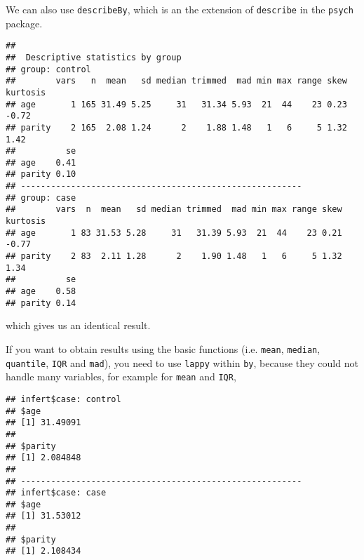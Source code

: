 \documentclass[]{book}
\newenvironment{Shaded}{\begin{snugshade}}{\end{snugshade}}
\newcommand{\KeywordTok}[1]{\textcolor[rgb]{0.13,0.29,0.53}{\textbf{{#1}}}}
\newcommand{\DataTypeTok}[1]{\textcolor[rgb]{0.13,0.29,0.53}{{#1}}}
\newcommand{\StringTok}[1]{\textcolor[rgb]{0.31,0.60,0.02}{{#1}}}
\newcommand{\NormalTok}[1]{{#1}}
\theoremstyle{definition}
\theoremstyle{definition}
\theoremstyle{remark}
\begin{document}
We can also use \texttt{describeBy}, which is an the extension of
\texttt{describe} in the \texttt{psych} package.

\begin{Shaded}
\end{Shaded}

\begin{verbatim}
## 
##  Descriptive statistics by group 
## group: control
##        vars   n  mean   sd median trimmed  mad min max range skew kurtosis
## age       1 165 31.49 5.25     31   31.34 5.93  21  44    23 0.23    -0.72
## parity    2 165  2.08 1.24      2    1.88 1.48   1   6     5 1.32     1.42
##          se
## age    0.41
## parity 0.10
## -------------------------------------------------------- 
## group: case
##        vars  n  mean   sd median trimmed  mad min max range skew kurtosis
## age       1 83 31.53 5.28     31   31.39 5.93  21  44    23 0.21    -0.77
## parity    2 83  2.11 1.28      2    1.90 1.48   1   6     5 1.32     1.34
##          se
## age    0.58
## parity 0.14
\end{verbatim}

which gives us an identical result.

If you want to obtain results using the basic functions (i.e.
\texttt{mean}, \texttt{median}, \texttt{quantile}, \texttt{IQR} and
\texttt{mad}), you need to use \texttt{lappy} within \texttt{by},
because they could not handle many variables, for example for
\texttt{mean} and \texttt{IQR},

\begin{Shaded}
\end{Shaded}

\begin{verbatim}
## infert$case: control
## $age
## [1] 31.49091
## 
## $parity
## [1] 2.084848
## 
## -------------------------------------------------------- 
## infert$case: case
## $age
## [1] 31.53012
## 
## $parity
## [1] 2.108434
\end{verbatim}
\end{document}
